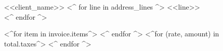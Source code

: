 \documentclass{invoice}
\begin{document}
  \begin{invoiceHead}
  \begin{billto}{<<client_name>>}
    <^ for line in address_lines ^>
      <<line>>\\
    <^ endfor ^>
    \end{billto}

  \end{invoiceHead}

  \begin{invoiceTable}
    <^for item in invoice.items^>
    <^ endfor ^>
    <^for (rate, amount) in total.taxes^>
    <^ endfor ^>
  \end{invoiceTable}
\end{document}
